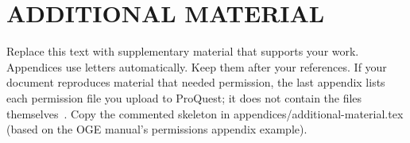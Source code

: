 \chapter{ADDITIONAL MATERIAL}
\label{app:additional}

Replace this text with supplementary material that supports your work.
Appendices use letters automatically. Keep them after your references.
If your document reproduces material that needed permission, the last
appendix lists each permission file you upload to ProQuest; it does not
contain the files themselves~\parencite{rpi-submission}. Copy the commented
skeleton in appendices/additional-material.tex (based on the OGE manual's
permissions appendix example).

%
